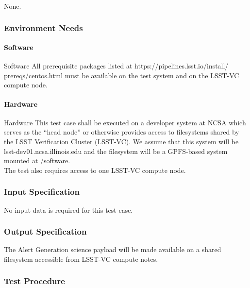 None.



\subsubsection{Environment Needs}

\paragraph{Software}

Software All prerequisite packages listed at
https://pipelines.lsst.io/install/ prereqs/centos.html must be available
on the test system and on the LSST-VC compute node.



\paragraph{Hardware}

Hardware This test case shall be executed on a developer system at NCSA
which serves as the ``head node'' or otherwise provides access to
filesystems shared by the LSST Verification Cluster (LSST-VC). We assume
that this system will be lsst-dev01.ncsa.illinois.edu and the filesystem
will be a GPFS-based system mounted at /software.\\
The test also requires access to one LSST-VC compute node.



\subsubsection{Input Specification}

No input data is required for this test case.



\subsubsection{Output Specification}

The Alert Generation science payload will be made available on a shared
filesystem accessible from LSST-VC compute notes.



\subsubsection{Test Procedure}

